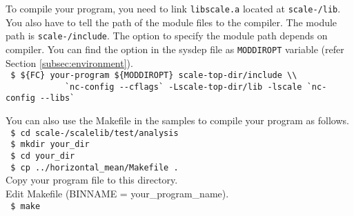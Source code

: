 To compile your program, you need to link \verb|libscale.a| located at \texttt{scale-\version/lib}.
You also have to tell the path of the module files to the compiler.
The module path is \texttt{scale-\version/include}.
The option to specify the module path depends on compiler.
You can find the option in the sysdep file as \verb|MODDIROPT| variable (refer Section \ref{subsec:environment}).\\
\verb| $ ${FC} your-program ${MODDIROPT} scale-top-dir/include \\|\\
\verb|            `nc-config --cflags` -Lscale-top-dir/lib -lscale `nc-config --libs`|

You can also use the Makefile in the samples to compile your program as follows.\\
\texttt{ \$ cd scale-\version/scalelib/test/analysis}\\
\texttt{ \$ mkdir your\_dir}\\
\texttt{ \$ cd your\_dir}\\
\texttt{ \$ cp ../horizontal\_mean/Makefile .}\\
Copy your program file to this directory.\\
Edit Makefile (BINNAME = your\_program\_name).\\
\texttt{ \$ make}

